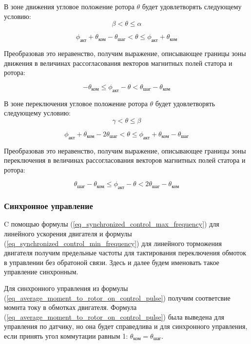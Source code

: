 В зоне движения угловое положение ротора $\theta$ будет удовлетворять следующему условию:
$$
    \beta < \theta \leq \alpha
$$

\begin{equation}
    \label{movement_zone_negat_dir_for_curr_pos}
    \phi_\textit{акт} + \theta_\textit{ком} - \theta_\textit{шаг}
    <     \theta
    \leq \phi_\textit{акт} + \theta_\textit{ком}
\end{equation}

Преобразовав это неравенство, получим выражение, описывающее границы зоны
движения в величинах рассогласования векторов магнитных полей статора и ротора:

\begin{equation}
    \label{movement_zone_negat_dir_for_delta}
    -\theta_\textit{ком}
    \leq \phi_\textit{акт} - \theta
    < \theta_\textit{шаг} - \theta_\textit{ком}
\end{equation}

В зоне переключения угловое положение ротора $\theta$ будет удовлетворять
следующему условию:
$$
    \gamma < \theta \leq \beta
$$

\begin{equation}
    \label{switch_zone_negat_dir_for_curr_pos}
    \phi_\textit{акт} + \theta_\textit{ком} - 2\theta_\textit{шаг}
    < \theta \leq
    \phi_\textit{акт} + \theta_\textit{ком} - \theta_\textit{шаг}
\end{equation}

Преобразовав это неравенство, получим выражение, описывающее границы зоны
переключения в величинах рассогласования векторов магнитных полей статора и
ротора:

\begin{equation}
    \label{switch_zone_negat_dir_for_delta}
    \theta_\textit{шаг} - \theta_\textit{ком}
    \leq \phi_\textit{акт} - \theta
    < 2\theta_\textit{шаг} - \theta_\textit{ком}
\end{equation}

\subsubsection{Синхронное управление}
C помощью формулы (\ref{eq_synchronized_control_max_frequency}) для линейного
ускорения двигателя и формулы (\ref{eq_synchronized_control_min_frequency}) для
линейного торможения двигателя получим предельные частоты для тактирования
переключения обмоток в управлении без обратоной связи. Здесь и далее будем
именовать такое управление синхронным.

Для синхронного управления из формулы
(\ref{eq_average_moment_to_rotor_on_control_pulse}) получим соответсвие момнта току в обмотках
двигателя. Формула (\ref{eq_average_moment_to_rotor_on_control_pulse}) была
выведена для управления по датчику, но она будет справедлива и для синхронного
управления, если принять угол коммутации равным 1:
$\theta_\textit{ком} = \theta_\textit{шаг}$.
